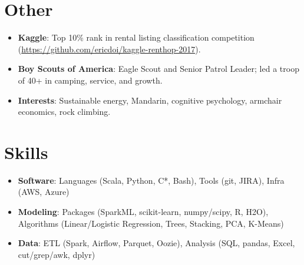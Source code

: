 \documentclass[letterpaper,11pt]{article}
\newcommand{\resumeItem}[2]{
  \item\small{
    \textbf{#1}{: #2 \vspace{-2pt}}
  }
}
\newcommand{\resumeSubItem}[2]{\resumeItem{#1}{#2}\vspace{-4pt}}
\newcommand{\resumeSubHeadingListStart}{\begin{itemize}[leftmargin=*]}
\newcommand{\resumeSubHeadingListEnd}{\end{itemize}}
\begin{document}
\section{Other}
  \resumeSubHeadingListStart
    \resumeSubItem{Kaggle}
      {Top 10\% rank in rental listing classification competition (\href{github.com/ericdoi/kaggle-renthop-2017}{https://github.com/ericdoi/kaggle-renthop-2017}).}
    \resumeSubItem{Boy Scouts of America}
      {Eagle Scout and Senior Patrol Leader; led a troop of 40+ in camping, service, and growth.}
    \resumeSubItem{Interests}
      {Sustainable energy, Mandarin, cognitive psychology, armchair economics, rock climbing.}
  \resumeSubHeadingListEnd


\section{Skills}
  \resumeSubHeadingListStart
    \resumeItem{Software}{Languages (Scala, Python, C*, Bash), Tools (git, JIRA), Infra (AWS, Azure)}
    \resumeItem{Modeling}{Packages (SparkML, scikit-learn, numpy/scipy, R, H2O), Algorithms (Linear/Logistic Regression, Trees, Stacking, PCA, K-Means)}
    \resumeItem{Data}{ETL (Spark, Airflow, Parquet, Oozie), Analysis (SQL, pandas, Excel, cut/grep/awk, dplyr)}
  \resumeSubHeadingListEnd


\end{document}
